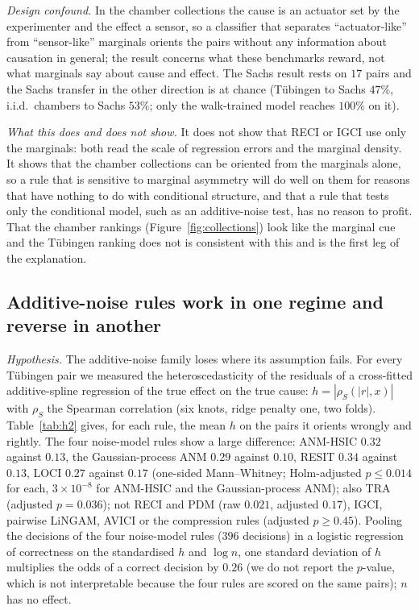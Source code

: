 \emph{Design confound.} In the chamber collections the cause is an actuator set by the experimenter and the effect a sensor, so a classifier that separates ``actuator-like'' from ``sensor-like'' marginals orients the pairs without any information about causation in general; the result concerns what these benchmarks reward, not what marginals say about cause and effect. The Sachs result rests on $17$ pairs and the Sachs transfer in the other direction is at chance (T\"ubingen to Sachs $47\%$, i.i.d.\ chambers to Sachs $53\%$; only the walk-trained model reaches $100\%$ on it).

\emph{What this does and does not show.} It does not show that RECI or IGCI use only the marginals: both read the scale of regression errors and the marginal density. It shows that the chamber collections can be oriented from the marginals alone, so a rule that is sensitive to marginal asymmetry will do well on them for reasons that have nothing to do with conditional structure, and that a rule that tests only the conditional model, such as an additive-noise test, has no reason to profit. That the chamber rankings (Figure~\ref{fig:collections}) look like the marginal cue and the T\"ubingen ranking does not is consistent with this and is the first leg of the explanation.

\subsection{Additive-noise rules work in one regime and reverse in another}\label{sec:regimes}
\emph{Hypothesis.} The additive-noise family loses where its assumption fails. For every T\"ubingen pair we measured the heteroscedasticity of the residuals of a cross-fitted additive-spline regression of the true effect on the true cause: $h=|\rho_S(|r|,x)|$ with $\rho_S$ the Spearman correlation (six knots, ridge penalty one, two folds). Table~\ref{tab:h2} gives, for each rule, the mean $h$ on the pairs it orients wrongly and rightly. The four noise-model rules show a large difference: ANM-HSIC $0.32$ against $0.13$, the Gaussian-process ANM $0.29$ against $0.10$, RESIT $0.34$ against $0.13$, LOCI $0.27$ against $0.17$ (one-sided Mann--Whitney; Holm-adjusted $p\le 0.014$ for each, $3\times10^{-8}$ for ANM-HSIC and the Gaussian-process ANM); also TRA (adjusted $p=0.036$); not RECI and PDM (raw $0.021$, adjusted $0.17$), IGCI, pairwise LiNGAM, AVICI or the compression rules (adjusted $p\ge 0.45$). Pooling the decisions of the four noise-model rules ($396$ decisions) in a logistic regression of correctness on the standardised $h$ and $\log n$, one standard deviation of $h$ multiplies the odds of a correct decision by $0.26$ (we do not report the $p$-value, which is not interpretable because the four rules are scored on the same pairs); $n$ has no effect.

